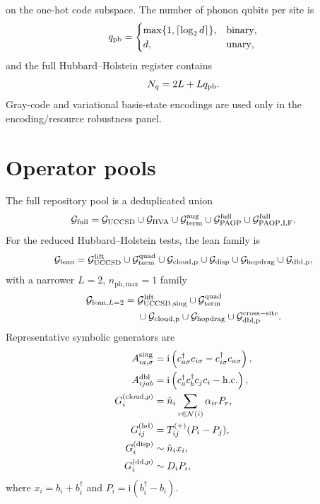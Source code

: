 \documentclass[
  reprint,
  amsmath,
  amssymb,
  aps,
  pra,
  nofootinbib,
  superscriptaddress,
  floatfix
]{revtex4-2}
\newcommand{\Gset}{\mathcal{G}}
\newcommand{\ii}{\mathrm{i}}
\newcommand{\phmax}{n_{\mathrm{ph,max}}}
\begin{document}
on the one-hot code subspace. The number of phonon qubits per site is
\begin{equation}
q_{\rm pb}=\begin{cases}
\max\{1,\lceil\log_2 d\rceil\}, & \text{binary},\\
d, & \text{unary},
\end{cases}
\label{eq:qpb}
\end{equation}
and the full Hubbard--Holstein register contains
\begin{equation}
N_q=2L+Lq_{\rm pb}.
\label{eq:nqubits}
\end{equation}
Gray-code and variational basis-state encodings are used only in the encoding/resource robustness panel.

\section{Operator pools}
\label{app:pools}

The full repository pool is a deduplicated union
\begin{equation}
\Gset_{\rm full}=\Gset_{\rm UCCSD}\cup\Gset_{\rm HVA}\cup\Gset_{\rm term}^{\rm aug}\cup\Gset_{\rm PAOP}^{\rm full}\cup\Gset_{\rm PAOP,LF}^{\rm full}.
\label{eq:full_meta_pool}
\end{equation}
For the reduced Hubbard--Holstein tests, the lean family is
\begin{equation}
\Gset_{\rm lean}=\Gset_{\rm UCCSD}^{\rm lift}\cup\Gset_{\rm term}^{\rm quad}\cup\Gset_{\rm cloud,p}\cup\Gset_{\rm disp}\cup\Gset_{\rm hopdrag}\cup\Gset_{\rm dbl,p},
\label{eq:lean_pool}
\end{equation}
with a narrower $L=2$, $\phmax=1$ family
\begin{equation}
\begin{aligned}
\Gset_{{\rm lean},L=2}={}&\Gset_{\rm UCCSD,sing}^{\rm lift}\cup\Gset_{\rm term}^{\rm quad}\\
&\cup\Gset_{\rm cloud,p}\cup\Gset_{\rm hopdrag}\cup\Gset_{\rm dbl,p}^{\rm cross-site}.
\end{aligned}
\label{eq:l2_lean_pool}
\end{equation}
Representative symbolic generators are
\begin{align}
A_{ia,\sigma}^{\rm sing}&=\ii\left(c_{a\sigma}^{\dagger}c_{i\sigma}-c_{i\sigma}^{\dagger}c_{a\sigma}\right),
\nonumber\\
A_{ijab}^{\rm dbl}&=\ii\left(c_a^{\dagger}c_b^{\dagger}c_jc_i-\mathrm{h.c.}\right),
\nonumber\\
G_i^{({\rm cloud},p)}&=\tilde n_i\sum_{r\in\mathcal N(i)}\alpha_{ir}P_r,
\nonumber\\
G_{ij}^{({\rm hd})}&=T_{ij}^{(+)}(P_i-P_j),
\nonumber\\
G_i^{({\rm disp})}&\sim \tilde n_ix_i,
\nonumber\\
G_i^{({\rm dd},p)}&\sim D_iP_i,
\label{eq:pool_family_symbols}
\end{align}
where $x_i=b_i+b_i^{\dagger}$ and $P_i=\ii(b_i^{\dagger}-b_i)$.
\end{document}
